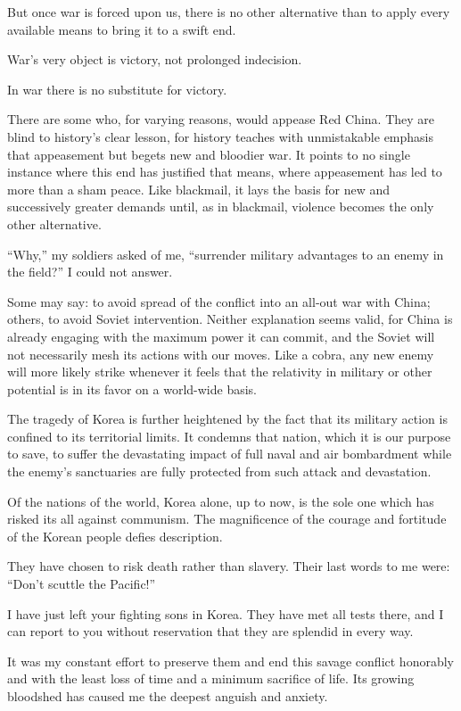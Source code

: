 \documentclass[a4paper]{amsbook}
\begin{document}
But once war is forced upon us, there is no other alternative than to apply every available means to bring it to a swift end.

War's very object is victory, not prolonged indecision.

In war there is no substitute for victory.

There are some who, for varying reasons, would appease Red China. They are blind to history's clear lesson, for history teaches with unmistakable emphasis that appeasement but begets new and bloodier war. It points to no single instance where this end has justified that means, where appeasement has led to more than a sham peace. Like blackmail, it lays the basis for new and successively greater demands until, as in blackmail, violence becomes the only other alternative.

“Why,” my soldiers asked of me, “surrender military advantages to an enemy in the field?” I could not answer.

Some may say: to avoid spread of the conflict into an all-out war with China; others, to avoid Soviet intervention. Neither explanation seems valid, for China is already engaging with the maximum power it can commit, and the Soviet will not necessarily mesh its actions with our moves. Like a cobra, any new enemy will more likely strike whenever it feels that the relativity in military or other potential is in its favor on a world-wide basis.

The tragedy of Korea is further heightened by the fact that its military action is confined to its territorial limits. It condemns that nation, which it is our purpose to save, to suffer the devastating impact of full naval and air bombardment while the enemy's sanctuaries are fully protected from such attack and devastation.

Of the nations of the world, Korea alone, up to now, is the sole one which has risked its all against communism. The magnificence of the courage and fortitude of the Korean people defies description.

They have chosen to risk death rather than slavery. Their last words to me were: “Don't scuttle the Pacific!”

I have just left your fighting sons in Korea. They have met all tests there, and I can report to you without reservation that they are splendid in every way.

It was my constant effort to preserve them and end this savage conflict honorably and with the least loss of time and a minimum sacrifice of life. Its growing bloodshed has caused me the deepest anguish and anxiety.
\end{document}
